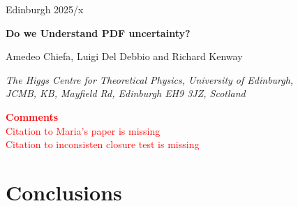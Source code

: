\documentclass[11pt,a4paper]{article}
\newcommand{\red}[1]{\textcolor{red}{#1}}
\begin{document}
\vspace{-2.0cm}
\begin{flushright}
Edinburgh 2025/x
\end{flushright}
\vspace{0.3cm}

\begin{center}
  {\Large \bf Do we Understand PDF uncertainty?}
  \vspace{1.1cm}

  Amedeo Chiefa, Luigi Del Debbio and Richard Kenway

  \vspace{0.2cm}

  {\it \small
    The Higgs Centre for Theoretical Physics, University of Edinburgh,\\
    JCMB, KB, Mayfield Rd, Edinburgh EH9 3JZ, Scotland\\[0.1cm]
  }
  \vspace{0.7cm}

  {\Large \bf \textcolor{red}{Comments}}\\
  \red{
    Citation to Maria's paper is missing\\
    Citation to inconsisten closure test is missing\\
  }
\end{center}

\begin{abstract}
  Parton Distribution Functions (PDFs) play a crucial role in describing
  experimental data at hadron colliders and provide insight into proton
  structure. As the LHC enters an era of high-precision measurements, a robust
  PDF determination with a reliable uncertainty quantification has become
  increasingly important to match the experimental precision. The NNPDF
  collaboration has pioneered the use of Machine Learning (ML) techniques for PDF
  determination. In this work, we develop a theoretical framework based on the
  Neural Tangent Kernel (NTK) to analyze the training dynamics of Neural
  Networks. This approach allows us to derive, under certain assumptions, an
  analytical description of how the neural network evolves during training,
  enabling us to better understand the NNPDF methodology and its dependence on
  the underlying model architecture. Notably, we demonstrate that our results
  contrast, to some extent, with the standard picture of the \textit{lazy training}
  regime commonly discussed in the ML community.
\end{abstract}

\tableofcontents
\clearpage








\section{Conclusions}
\label{sec:Conclusions}

\newpage


\appendix





\end{document}
